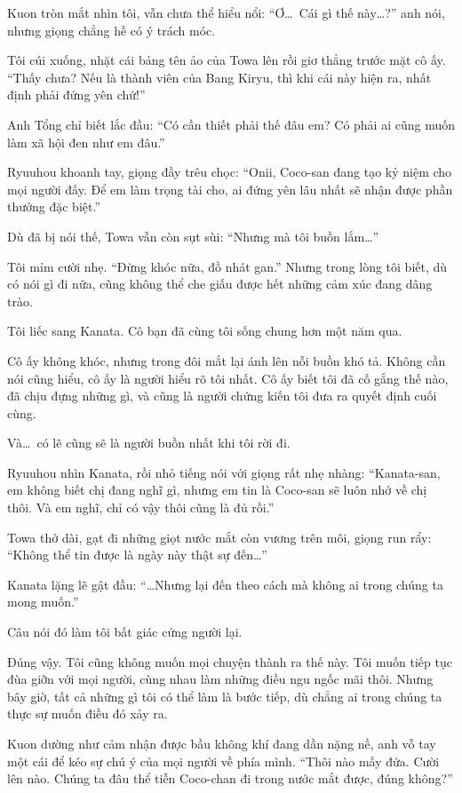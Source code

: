 \documentclass[../main.tex]{subfiles}
\begin{document}
Kuon tròn mắt nhìn tôi, vẫn chưa thể hiểu nổi: ``Ơ\dots\ Cái gì thế này\dots?'' anh nói, nhưng giọng chẳng hề có ý trách móc.

Tôi cúi xuống, nhặt cái bảng tên ảo của Towa lên rồi giơ thẳng trước mặt cô ấy. ``Thấy chưa? Nếu là thành viên của Bang Kiryu, thì khi cái này hiện ra, nhất định phải đứng yên chứ!''

Anh Tổng chỉ biết lắc đầu: ``Có cần thiết phải thế đâu em? Có phải ai cũng muốn làm xã hội đen như em đâu.''

Ryuuhou khoanh tay, giọng đầy trêu chọc: ``Onii, Coco-san đang tạo kỷ niệm cho mọi người đấy. Để em làm trọng tài cho, ai đứng yên lâu nhất sẽ nhận được phần thưởng đặc biệt.''

Dù đã bị nói thế, Towa vẫn còn sụt sùi: ``Nhưng mà tôi buồn lắm\dots''


Tôi mỉm cười nhẹ. ``Đừng khóc nữa, đồ nhát gan.'' Nhưng trong lòng tôi biết, dù có nói gì đi nữa, cũng không thể che giấu được hết những cảm xúc đang dâng trào.

Tôi liếc sang Kanata. Cô bạn đã cùng tôi sống chung hơn một năm qua.

Cô ấy không khóc, nhưng trong đôi mắt lại ánh lên nỗi buồn khó tả. Không cần nói cũng hiểu, cô ấy là người hiểu rõ tôi nhất. Cô ấy biết tôi đã cố gắng thế nào, đã chịu đựng những gì, và cũng là người chứng kiến tôi đưa ra quyết định cuối cùng.

Và\dots\ có lẽ cũng sẽ là người buồn nhất khi tôi rời đi.

Ryuuhou nhìn Kanata, rồi nhỏ tiếng nói với giọng rất nhẹ nhàng: ``Kanata-san, em không biết chị đang nghĩ gì, nhưng em tin là Coco-san sẽ luôn nhớ về chị thôi. Và em nghĩ, chỉ có vậy thôi cũng là đủ rồi.''

Towa thở dài, gạt đi những giọt nước mắt còn vương trên môi, giọng run rẩy: ``Không thể tin được là ngày này thật sự đến\dots''

Kanata lặng lẽ gật đầu: ``\dots Nhưng lại đến theo cách mà không ai trong chúng ta mong muốn.''

Câu nói đó làm tôi bất giác cứng người lại.

Đúng vậy. Tôi cũng không muốn mọi chuyện thành ra thế này. Tôi muốn tiếp tục đùa giỡn với mọi người, cùng nhau làm những điều ngu ngốc mãi thôi. Nhưng bây giờ, tất cả những gì tôi có thể làm là bước tiếp, dù chẳng ai trong chúng ta thực sự muốn điều đó xảy ra.

Kuon dường như cảm nhận được bầu không khí đang dần nặng nề, anh vỗ tay một cái để kéo sự chú ý của mọi người về phía mình. ``Thôi nào mấy đứa. Cười lên nào. Chúng ta đâu thể tiễn Coco-chan đi trong nước mắt được, đúng không?''
\end{document}
